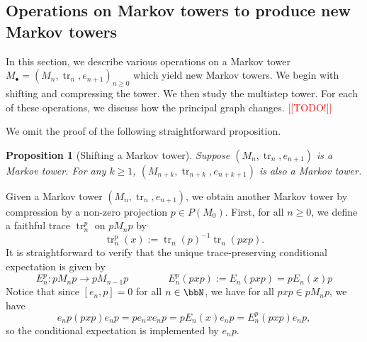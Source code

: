 \documentclass[11pt]{article}
\theoremstyle{plain}
\newtheorem{prop}[thm]{Proposition}
\theoremstyle{definition}
\DeclareMathOperator{\tr}{tr}
\newcommand{\nn}[1]{\textcolor{red}{[[#1]]}}
\begin{document}
\subsection{Operations on Markov towers to produce new Markov towers}
\label{sec:OperationsOnMarkovTowers}

In this section, we describe various operations on a Markov tower $M_\bullet = (M_n, \tr_n, e_{n+1})_{n\geq 0}$ which yield new Markov towers.
We begin with shifting and compressing the tower.
We then study the multistep tower.
For each of these operations, we discuss how the principal graph changes. 
\nn{TODO!}

We omit the proof of the following straightforward proposition.

\begin{prop}[Shifting a Markov tower]
\label{prop:ShiftMarkovTower}
Suppose $(M_n, \tr_n, e_{n+1})$ is a Markov tower.
For any $k\geq 1$, $(M_{n+k}, \tr_{n+k}, e_{n+k+1})$ is also a Markov tower.
\end{prop}

Given a Markov tower $(M_n,\tr_n, e_{n+1})$, we obtain another Markov tower by compression by a non-zero projection $p\in P(M_0)$.
First, for all $n\geq 0$, we define a faithful trace $\tr_n^p$ on $pM_n p$ by
\begin{equation}
\label{eq:CompressedTrace}
\tr^p_n(x) := \tr_n(p)^{-1}\tr_n(pxp).
\end{equation}
It is straightforward to verify that the unique trace-preserving conditional expectation is given by 
\begin{equation}
\label{eq:CompressedConditionalExpectation}
E^p_n : pM_np \to pM_{n-1}p
\qquad
\qquad
E^p_n(pxp) := E_n(pxp) = pE_n(x)p
\end{equation}
Notice that since $[e_n,p] = 0$ for all $n\in \bbN$, we have for all $pxp \in pM_n p$, we have 
\begin{equation}
\label{eq:CompressionImplementsConditionalExpectation}
e_np (pxp) e_np = p e_nxe_np = pE_n(x)e_np = E_n^p(pxp)e_np,
\end{equation}
so the conditional expectation is implemented by $e_np$.
\end{document}
